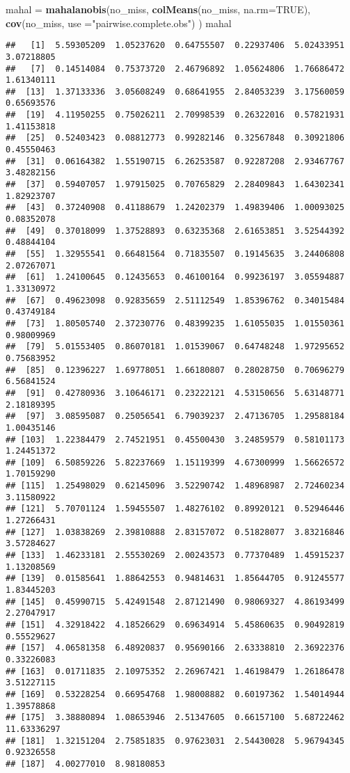 \documentclass[
]{article}
\newenvironment{Shaded}{\begin{snugshade}}{\end{snugshade}}
\newcommand{\DataTypeTok}[1]{\textcolor[rgb]{0.13,0.29,0.53}{#1}}
\newcommand{\KeywordTok}[1]{\textcolor[rgb]{0.13,0.29,0.53}{\textbf{#1}}}
\newcommand{\NormalTok}[1]{#1}
\newcommand{\OtherTok}[1]{\textcolor[rgb]{0.56,0.35,0.01}{#1}}
\newcommand{\StringTok}[1]{\textcolor[rgb]{0.31,0.60,0.02}{#1}}
\begin{document}
\begin{Shaded}
\begin{Highlighting}[]
\NormalTok{mahal =}\StringTok{ }\KeywordTok{mahalanobis}\NormalTok{(no_miss,}
                    \KeywordTok{colMeans}\NormalTok{(no_miss, }\DataTypeTok{na.rm=}\OtherTok{TRUE}\NormalTok{),}
                    \KeywordTok{cov}\NormalTok{(no_miss, }\DataTypeTok{use =}\StringTok{"pairwise.complete.obs"}\NormalTok{)}
\NormalTok{                    )}
\NormalTok{mahal}
\end{Highlighting}
\end{Shaded}

\begin{verbatim}
##   [1]  5.59305209  1.05237620  0.64755507  0.22937406  5.02433951  3.07218805
##   [7]  0.14514084  0.75373720  2.46796892  1.05624806  1.76686472  1.61340111
##  [13]  1.37133336  3.05608249  0.68641955  2.84053239  3.17560059  0.65693576
##  [19]  4.11950255  0.75026211  2.70998539  0.26322016  0.57821931  1.41153818
##  [25]  0.52403423  0.08812773  0.99282146  0.32567848  0.30921806  0.45550463
##  [31]  0.06164382  1.55190715  6.26253587  0.92287208  2.93467767  3.48282156
##  [37]  0.59407057  1.97915025  0.70765829  2.28409843  1.64302341  1.82923707
##  [43]  0.37240908  0.41188679  1.24202379  1.49839406  1.00093025  0.08352078
##  [49]  0.37018099  1.37528893  0.63235368  2.61653851  3.52544392  0.48844104
##  [55]  1.32955541  0.66481564  0.71835507  0.19145635  3.24406808  2.07267071
##  [61]  1.24100645  0.12435653  0.46100164  0.99236197  3.05594887  1.33130972
##  [67]  0.49623098  0.92835659  2.51112549  1.85396762  0.34015484  0.43749184
##  [73]  1.80505740  2.37230776  0.48399235  1.61055035  1.01550361  0.98009969
##  [79]  5.01553405  0.86070181  1.01539067  0.64748248  1.97295652  0.75683952
##  [85]  0.12396227  1.69778051  1.66180807  0.28028750  0.70696279  6.56841524
##  [91]  0.42780936  3.10646171  0.23222121  4.53150656  5.63148771  2.18189395
##  [97]  3.08595087  0.25056541  6.79039237  2.47136705  1.29588184  1.00435146
## [103]  1.22384479  2.74521951  0.45500430  3.24859579  0.58101173  1.24451372
## [109]  6.50859226  5.82237669  1.15119399  4.67300999  1.56626572  1.70159290
## [115]  1.25498029  0.62145096  3.52290742  1.48968987  2.72460234  3.11580922
## [121]  5.70701124  1.59455507  1.48276102  0.89920121  0.52946446  1.27266431
## [127]  1.03838269  2.39810888  2.83157072  0.51828077  3.83216846  3.57284627
## [133]  1.46233181  2.55530269  2.00243573  0.77370489  1.45915237  1.13208569
## [139]  0.01585641  1.88642553  0.94814631  1.85644705  0.91245577  1.83445203
## [145]  0.45990715  5.42491548  2.87121490  0.98069327  4.86193499  2.27047917
## [151]  4.32918422  4.18526629  0.69634914  5.45860635  0.90492819  0.55529627
## [157]  4.06581358  6.48920837  0.95690166  2.63338810  2.36922376  0.33226083
## [163]  0.01711835  2.10975352  2.26967421  1.46198479  1.26186478  3.51227115
## [169]  0.53228254  0.66954768  1.98008882  0.60197362  1.54014944  1.39578868
## [175]  3.38880894  1.08653946  2.51347605  0.66157100  5.68722462 11.63336297
## [181]  1.32151204  2.75851835  0.97623031  2.54430028  5.96794345  0.92326558
## [187]  4.00277010  8.98180853
\end{verbatim}
\end{document}
